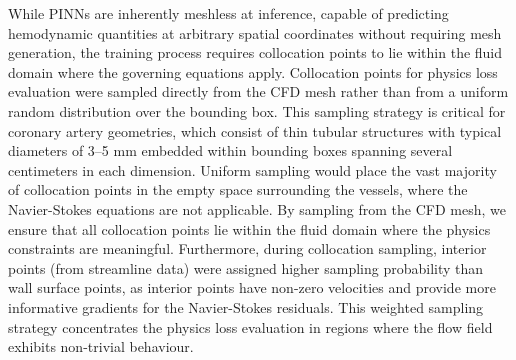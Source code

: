 ﻿\documentclass[12pt,a4paper]{article}
\theoremstyle{definition}
\numberwithin{equation}{section}
\begin{document}
{{While PINNs are inherently meshless at inference, capable of predicting hemodynamic quantities at arbitrary spatial coordinates without requiring mesh generation, the training process requires collocation points to lie within the fluid domain where the governing equations apply.} Collocation points for physics loss evaluation were sampled directly from the CFD mesh rather than from a uniform random distribution over the bounding box. This sampling strategy is critical for coronary artery geometries, which consist of thin tubular structures with typical diameters of 3--5 mm embedded within bounding boxes spanning several centimeters in each dimension. Uniform sampling would place the vast majority of collocation points in the empty space surrounding the vessels, where the Navier-Stokes equations are not applicable. By sampling from the CFD mesh, we ensure that all collocation points lie within the fluid domain where the physics constraints are meaningful. Furthermore, during collocation sampling, interior points (from streamline data) were assigned higher sampling probability than wall surface points, as interior points have non-zero velocities and provide more informative gradients for the Navier-Stokes residuals. This weighted sampling strategy concentrates the physics loss evaluation in regions where the flow field exhibits non-trivial behaviour.

}
\end{document}
